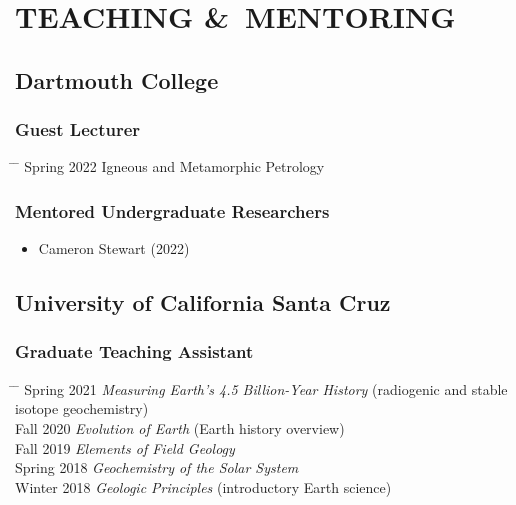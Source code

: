 \section*{TEACHING \&\ MENTORING}
\subsection*{\textbf{Dartmouth College}}
\subsubsection*{Guest Lecturer}
\begin{tabbing} \hspace{10pt} \= \hspace{2.5cm} \=  \kill
\> Spring 2022 \> Igneous and Metamorphic Petrology
\end{tabbing}

\subsubsection*{Mentored Undergraduate Researchers}
\begin{itemize}
	\item Cameron Stewart (2022)
\end{itemize}

\subsection*{\textbf{University of California Santa Cruz}}
\subsubsection*{Graduate Teaching Assistant}
\begin{tabbing} \hspace{10pt} \= \hspace{2.5cm} \=  \kill
	\> Spring 2021 \> \textit{Measuring Earth’s 4.5 Billion-Year History} (radiogenic and stable isotope geochemistry)\\
	\> Fall 2020 \> \textit{Evolution of Earth} (Earth history overview) \\
	\> Fall 2019 \> \textit{Elements of Field Geology}\\
	\> Spring 2018 \>  \textit{Geochemistry of the Solar System}\\
	\> Winter 2018 \> \textit{Geologic Principles} (introductory Earth science)
\end{tabbing}

